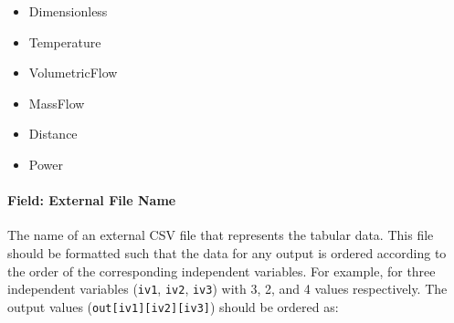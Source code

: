 \begin{itemize}
\tightlist
\item
Dimensionless
\item
Temperature
\item
VolumetricFlow
\item
MassFlow
\item
Distance
\item
Power
\end{itemize}

\paragraph{Field: External File
Name}\label{field-external-file-name-1}

The name of an external CSV file that represents the tabular data. This
file should be formatted such that the data for any output is ordered
according to the order of the corresponding independent variables. For
example, for three independent variables (\texttt{iv1}, \texttt{iv2},
\texttt{iv3}) with 3, 2, and 4 values respectively. The output values
(\texttt{out{[}iv1{]}{[}iv2{]}{[}iv3{]}}) should be ordered as:

